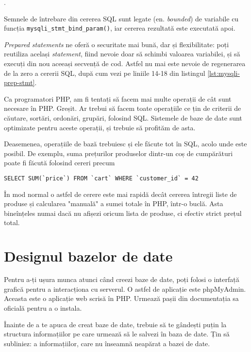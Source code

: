 .

Semnele de întrebare din cererea SQL sunt legate (en. \textsl{bounded})
de variabile cu funcția \texttt{mysqli\_stmt\_bind\_param()}, iar
cererea rezultată este executată apoi.

\textit{Prepared statements} ne oferă o securitate mai bună, dar și flexibilitate:
poți reutiliza același \textit{statement}, fiind nevoie doar să schimbi
valoarea variabilei, și să execuți din nou aceeași secvență de cod. Astfel
nu mai este nevoie de regenerarea de la zero a cererii SQL, după cum
vezi pe liniile 14-18 din listingul \ref{lst:mysqli-prep-stmt}.

Ca programatori PHP, am fi tentați să facem mai multe operații
de cât sunt necesare în PHP. Greșit. Ar trebui să facem toate
operațiile ce țin de criterii de căutare, sortări, ordonări, grupări,
folosind SQL. Sistemele de baze de date sunt optimizate pentru aceste
operații, și trebuie să profităm de asta.

Deasemenea, operațiile de bază trebuiesc și ele făcute tot în SQL, acolo
unde este posibil. De exemplu, suma prețurilor produselor dintr-un
coș de cumpărături poate fi făcută folosind cereri precum

\begin{lstlisting}
SELECT SUM(`price`) FROM `cart` WHERE `customer_id` = 42
\end{lstlisting}

În mod normal o astfel de cerere este mai rapidă decât cererea
întregii liste de produse și calcularea "manuală" a sumei totale
în PHP, într-o buclă. Asta bineînțeles numai dacă nu afișezi
oricum lista de produse, ci efectiv strict prețul total.


\section{Designul bazelor de date}
Pentru a-ți ușura munca atunci când creezi baze de date, poți folosi o interfață grafică
pentru a interacționa cu serverul. O astfel de aplicație este phpMyAdmin.
Aceasta este o aplicație web scrisă în PHP.
Urmează pașii
din documentația sa oficială pentru a o instala.

Înainte de a te apuca de creat baze de date, trebuie să te gândești puțin
la structura informațiilor pe care urmează să le salvezi în baza de date.
Țin să subliniez: a informațiilor, care nu înseamnă neapărat a bazei de date.

